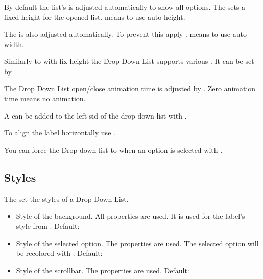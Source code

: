 \documentclass[letterpaper,10pt,english]{sphinxmanual}
\begin{document}
By default the list’s  is adjusted automatically to show all options. The  sets a fixed height for the opened list.  means to use auto height.

The  is also adjusted automatically. To prevent this apply .  means to use auto width.

Similarly to {\hyperref[\detokenize{object-types/page::doc}]{}} with fix height the Drop Down List supports various . It can be set by .

The Drop Down List open/close animation time is adjusted by . Zero animation time means no animation.

A  can be added to the left sid of the drop down list with .

To align the label horizontally use .

You can force the Drop down list to  when an option is selected with .


\subsection{Styles}
\label{\detokenize{object-types/ddlist:styles}}
The  set the styles of a Drop Down List.
\begin{itemize}
\item {} 
 Style of the background. All  properties are used. It is used for the label’s style from . Default: 

\item {} 
 Style of the selected option.  The  properties are used. The selected option will be recolored with . Default: 

\item {} 
 Style of the scrollbar. The  properties are used. Default: 

\end{itemize}
\end{document}
